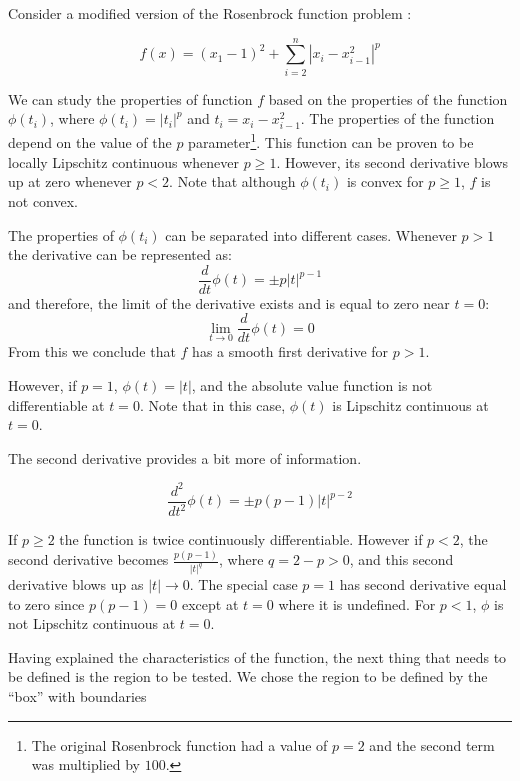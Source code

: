 Consider a modified version of the Rosenbrock function problem \citep{rosenbrock}:

\begin{equation} \label{modifiedrosenbrock}
    f(x) = (x_1 - 1)^2 + \sum_{i = 2}^n |x_i - x_{i - 1}^2|^p
\end{equation}

We can study the properties of function $f$ based on the properties of the function $\phi(t_i)$, where $\phi(t_i) = |t_i|^p$ and $t_i = x_i - x_{i - 1}^2$. The properties of the function depend on the value of the $p$ parameter\footnote{The original Rosenbrock function had a value of $p = 2$ and the second term was multiplied by $100$.}. This function can be proven to be locally Lipschitz continuous whenever $p \geq 1$. However, its second derivative blows up at zero whenever $p < 2$. Note that although $\phi(t_i)$ is convex for $p \geq 1$, $f$ is not convex.

The properties of $\phi(t_i)$ can be separated into different cases. Whenever $p > 1$ the derivative can be represented as:
\begin{equation}\label{firstderiv}
  \frac{d}{dt} \phi(t) = \pm p |t|^{p-1}
\end{equation}
and therefore, the limit of the derivative exists and is equal to zero near $t = 0$: \[ \lim_{t \to 0} \frac{d}{dt}\phi(t) = 0 \] From this we conclude that $f$ has a smooth first derivative for $p > 1$.

However, if $p = 1$, $\phi(t) = |t|$, and the absolute value function is not differentiable at $t = 0$. Note that in this case, $\phi(t)$ is Lipschitz continuous at $t = 0$.

The second derivative provides a bit more of information.

\begin{equation}\label{secondderiv}
  \frac{d^2}{dt^2} \phi(t) = \pm p(p-1) |t|^{p-2}
\end{equation}

If $p \geq 2$ the function is twice continuously differentiable. However if $p < 2$, the second derivative becomes $\frac{p(p-1)}{|t|^{q}}$, where $q = 2 - p > 0$, and this second derivative blows up as $|t| \to 0$. The special case $p = 1$ has second derivative equal to zero since $p(p-1) = 0$ except at $t = 0$ where it is undefined. For $p < 1$, $\phi$ is not Lipschitz continuous at $t = 0$.

Having explained the characteristics of the function, the next thing that needs to be defined is the region to be tested. We chose the region to be defined by the ``box'' with boundaries

